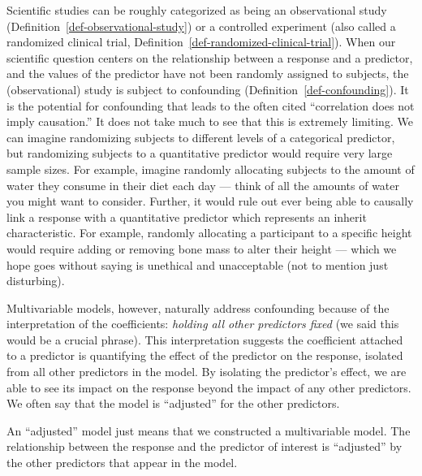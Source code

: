 \documentclass[
  letterpaper,
  DIV=11,
  numbers=noendperiod]{scrreprt}
\theoremstyle{definition}
\theoremstyle{definition}
\theoremstyle{remark}
\begin{document}
Scientific studies can be roughly categorized as being an observational
study (Definition~\ref{def-observational-study}) or a controlled
experiment (also called a randomized clinical trial,
Definition~\ref{def-randomized-clinical-trial}). When our scientific
question centers on the relationship between a response and a predictor,
and the values of the predictor have not been randomly assigned to
subjects, the (observational) study is subject to confounding
(Definition~\ref{def-confounding}). It is the potential for confounding
that leads to the often cited ``correlation does not imply causation.''
It does not take much to see that this is extremely limiting. We can
imagine randomizing subjects to different levels of a categorical
predictor, but randomizing subjects to a quantitative predictor would
require very large sample sizes. For example, imagine randomly
allocating subjects to the amount of water they consume in their diet
each day --- think of all the amounts of water you might want to
consider. Further, it would rule out ever being able to causally link a
response with a quantitative predictor which represents an inherit
characteristic. For example, randomly allocating a participant to a
specific height would require adding or removing bone mass to alter
their height --- which we hope goes without saying is unethical and
unacceptable (not to mention just disturbing).

Multivariable models, however, naturally address confounding because of
the interpretation of the coefficients: \emph{holding all other
predictors fixed} (we said this would be a crucial phrase). This
interpretation suggests the coefficient attached to a predictor is
quantifying the effect of the predictor on the response, isolated from
all other predictors in the model. By isolating the predictor's effect,
we are able to see its impact on the response beyond the impact of any
other predictors. We often say that the model is ``adjusted'' for the
other predictors.

\begin{tcolorbox}[enhanced jigsaw, bottomrule=.15mm, titlerule=0mm, bottomtitle=1mm, colback=white, coltitle=black, rightrule=.15mm, leftrule=.75mm, toprule=.15mm, toptitle=1mm, left=2mm, opacityback=0, colframe=quarto-callout-note-color-frame, breakable, title=\textcolor{quarto-callout-note-color}{\faInfo}\hspace{0.5em}{Adjusted Models}, arc=.35mm, colbacktitle=quarto-callout-note-color!10!white, opacitybacktitle=0.6]

An ``adjusted'' model just means that we constructed a multivariable
model. The relationship between the response and the predictor of
interest is ``adjusted'' by the other predictors that appear in the
model.

\end{tcolorbox}
\end{document}
